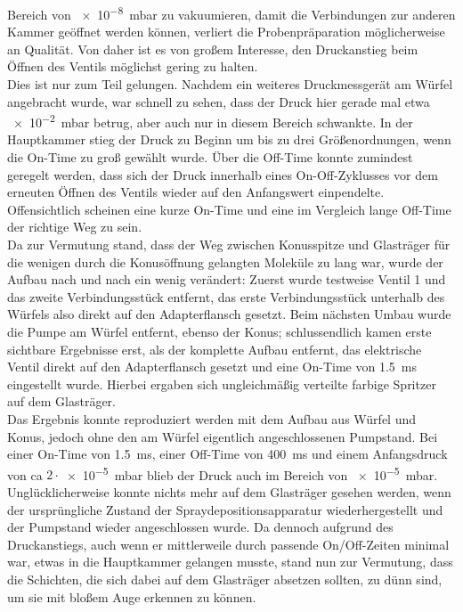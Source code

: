 Bereich von \SI{e-8}{mbar} zu vakuumieren, damit die Verbindungen zur anderen Kammer geöffnet werden
können, verliert die Probenpräparation möglicherweise an Qualität. Von daher ist es von großem
Interesse, den Druckanstieg beim Öffnen des Ventils möglichst gering zu halten.
\\
Dies ist nur zum Teil gelungen. Nachdem ein weiteres Druckmessgerät am Würfel angebracht wurde, war
schnell zu sehen, dass der Druck hier gerade mal etwa \SI{e-2}{mbar} betrug, aber auch nur in diesem
Bereich schwankte. In der Hauptkammer stieg der Druck zu Beginn um bis zu drei Größenordnungen, wenn
die On-Time zu groß gewählt wurde. Über die Off-Time konnte zumindest geregelt werden, dass sich der
Druck innerhalb eines On-Off-Zyklusses vor dem erneuten Öffnen des Ventils wieder auf den
Anfangswert einpendelte. Offensichtlich scheinen eine kurze On-Time und eine im Vergleich lange
Off-Time der richtige Weg zu sein.
\\
Da zur Vermutung stand, dass der Weg zwischen Konusspitze und Glasträger für die wenigen durch die
Konusöffnung gelangten Moleküle zu lang war, wurde der Aufbau nach und nach ein wenig verändert:
Zuerst wurde testweise Ventil 1 und das zweite Verbindungsstück entfernt, das erste Verbindungsstück
unterhalb des Würfels also direkt auf den Adapterflansch gesetzt. Beim nächsten Umbau wurde die
Pumpe am Würfel entfernt, ebenso der Konus; schlussendlich kamen erste sichtbare Ergebnisse erst,
als der komplette Aufbau entfernt, das elektrische Ventil direkt auf den
Adapterflansch gesetzt und eine On-Time von \SI{1,5}{ms} eingestellt wurde. Hierbei ergaben sich
ungleichmäßig verteilte farbige Spritzer auf dem Glasträger.
\\
Das Ergebnis konnte reproduziert werden mit dem Aufbau aus Würfel und Konus, jedoch ohne den am
Würfel eigentlich angeschlossenen Pumpstand. Bei einer On-Time von \SI{1,5}{ms}, einer Off-Time von
\SI{400}{ms} und einem Anfangsdruck von ca $2\cdot$\SI{e-5}{mbar} blieb der Druck auch im Bereich von
\SI{e-5}{mbar}.
\\
Unglücklicherweise konnte nichts mehr auf dem Glasträger gesehen werden, wenn der ursprüngliche
Zustand der Spraydepositionsapparatur wiederhergestellt und der Pumpstand wieder angeschlossen
wurde.
Da dennoch aufgrund des Druckanstiegs, auch wenn er mittlerweile durch passende On/Off-Zeiten minimal
war, etwas in die Hauptkammer gelangen musste, stand nun zur Vermutung, dass die Schichten, die
sich dabei auf dem Glasträger absetzen sollten, zu dünn sind, um sie mit bloßem Auge
erkennen zu können.
